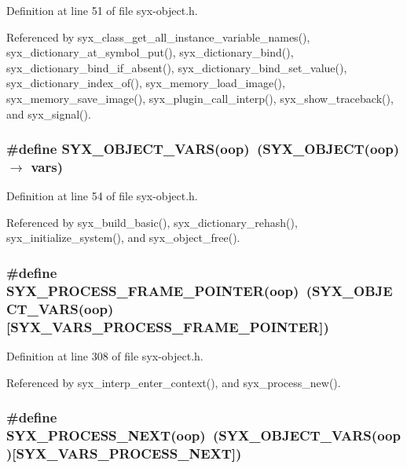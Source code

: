 Definition at line 51 of file syx-object.h.

Referenced by syx\_\-class\_\-get\_\-all\_\-instance\_\-variable\_\-names(), syx\_\-dictionary\_\-at\_\-symbol\_\-put(), syx\_\-dictionary\_\-bind(), syx\_\-dictionary\_\-bind\_\-if\_\-absent(), syx\_\-dictionary\_\-bind\_\-set\_\-value(), syx\_\-dictionary\_\-index\_\-of(), syx\_\-memory\_\-load\_\-image(), syx\_\-memory\_\-save\_\-image(), syx\_\-plugin\_\-call\_\-interp(), syx\_\-show\_\-traceback(), and syx\_\-signal().\hypertarget{syx-object_8h_4b6aa57daec9c56e87fe8948101d99bc}{
\subsubsection{\setlength{\rightskip}{0pt plus 5cm}\#define SYX\_\-OBJECT\_\-VARS(oop)~(SYX\_\-OBJECT(oop) $\rightarrow$ vars)}}
\label{syx-object_8h_4b6aa57daec9c56e87fe8948101d99bc}




Definition at line 54 of file syx-object.h.

Referenced by syx\_\-build\_\-basic(), syx\_\-dictionary\_\-rehash(), syx\_\-initialize\_\-system(), and syx\_\-object\_\-free().\hypertarget{syx-object_8h_c49eda7223af44f10a46c7be40bc3fac}{
\subsubsection{\setlength{\rightskip}{0pt plus 5cm}\#define SYX\_\-PROCESS\_\-FRAME\_\-POINTER(oop)~(SYX\_\-OBJECT\_\-VARS(oop)\mbox{[}SYX\_\-VARS\_\-PROCESS\_\-FRAME\_\-POINTER\mbox{]})}}
\label{syx-object_8h_c49eda7223af44f10a46c7be40bc3fac}




Definition at line 308 of file syx-object.h.

Referenced by syx\_\-interp\_\-enter\_\-context(), and syx\_\-process\_\-new().\hypertarget{syx-object_8h_0a046ecb9b0607671ce20996d5e986fe}{
\subsubsection{\setlength{\rightskip}{0pt plus 5cm}\#define SYX\_\-PROCESS\_\-NEXT(oop)~(SYX\_\-OBJECT\_\-VARS(oop)\mbox{[}SYX\_\-VARS\_\-PROCESS\_\-NEXT\mbox{]})}}
\label{syx-object_8h_0a046ecb9b0607671ce20996d5e986fe}




